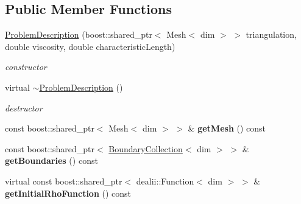 \subsection*{Public Member Functions}
\begin{DoxyCompactItemize}
\item 
\hypertarget{classnatrium_1_1ProblemDescription_afc92659d0022799b4e846cf050e8efad}{
\hyperlink{classnatrium_1_1ProblemDescription_afc92659d0022799b4e846cf050e8efad}{ProblemDescription} (boost::shared\_\-ptr$<$ Mesh$<$ dim $>$ $>$ triangulation, double viscosity, double characteristicLength)}
\label{classnatrium_1_1ProblemDescription_afc92659d0022799b4e846cf050e8efad}

\begin{DoxyCompactList}\small\item\em constructor \item\end{DoxyCompactList}\item 
\hypertarget{classnatrium_1_1ProblemDescription_a5270994970ddbd9f6fc98f292c1ccc0e}{
virtual \hyperlink{classnatrium_1_1ProblemDescription_a5270994970ddbd9f6fc98f292c1ccc0e}{$\sim$ProblemDescription} ()}
\label{classnatrium_1_1ProblemDescription_a5270994970ddbd9f6fc98f292c1ccc0e}

\begin{DoxyCompactList}\small\item\em destructor \item\end{DoxyCompactList}\item 
\hypertarget{classnatrium_1_1ProblemDescription_a16420fffc7d77b22611281b83c80664f}{
const boost::shared\_\-ptr$<$ Mesh$<$ dim $>$ $>$ \& {\bfseries getMesh} () const }
\label{classnatrium_1_1ProblemDescription_a16420fffc7d77b22611281b83c80664f}

\item 
\hypertarget{classnatrium_1_1ProblemDescription_ab42b3f2f0144d269bb38a4019e408209}{
const boost::shared\_\-ptr$<$ \hyperlink{classnatrium_1_1BoundaryCollection}{BoundaryCollection}$<$ dim $>$ $>$ \& {\bfseries getBoundaries} () const }
\label{classnatrium_1_1ProblemDescription_ab42b3f2f0144d269bb38a4019e408209}

\item 
\hypertarget{classnatrium_1_1ProblemDescription_adaf831d77fae721f84c2a915976cb726}{
virtual const boost::shared\_\-ptr$<$ dealii::Function$<$ dim $>$ $>$ \& {\bfseries getInitialRhoFunction} () const }
\label{classnatrium_1_1ProblemDescription_adaf831d77fae721f84c2a915976cb726}


\end{DoxyCompactItemize}
